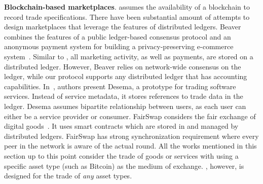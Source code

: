 \textbf{Blockchain-based marketplaces}.
\ModelName{} assumes the availability of a blockchain to record trade specifications. 
There have been substantial amount of attempts to design marketplaces that leverage the features of distributed ledgers. 
Beaver combines the features of a public ledger-based consensus protocol and an anonymous payment system for building a privacy-preserving e-commerce system~\cite{soska2016beaver}. 
Similar to \ModelName{}, all marketing activity, as well as payments, are stored on a distributed ledger. 
However, Beaver relies on network-wide consensus on the ledger, while our protocol supports any distributed ledger that has accounting capabilities. 
In~\cite{klems2017trustless}, authors present Desema, a prototype for trading software services. 
Instead of service metadata, it stores references to trade data in the ledger. 
Desema assumes bipartite relationship between users, as each user can either be a service provider or consumer. 
FairSwap considers the fair exchange of digital goods~\cite{dziembowski2018fairswap}. 
It uses smart contracts which are stored in and managed by distributed ledgers.
FairSwap has strong synchronization requirement where every peer in the network is aware of the actual round.
All the works mentioned in this section up to this point consider the trade of goods or services with using a specific asset type (such as Bitcoin) as the medium of exchange. 
\ModelName{}, however, is designed for the trade of \emph{any} asset types.






